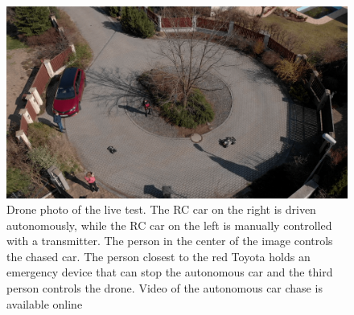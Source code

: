 \documentclass{ctuthesis/ctuthesis}
\begin{document}
\begin{figure}[]
    \centering
    \includegraphics[width=1\textwidth]{images/drone_shot_2.4.3-optimized.png} %
    \caption[Drone photo of the live test.]{Drone photo of the live test. The RC car on the right is driven autonomously, while the RC car on the left is manually controlled with a transmitter. The person in the center of the image controls the chased car. The person closest to the red Toyota holds an emergency device that can stop the autonomous car and the third person controls the drone. Video of the autonomous car chase is available online \cite{my_yt_video}}\label{f:video}
\end{figure}
\end{document}
